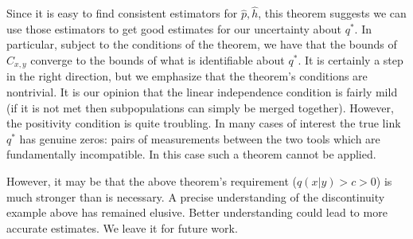 Since it is easy to find consistent estimators for $\hat p,\hat h$, this theorem suggests we can use those estimators to get good estimates for our uncertainty about $q^*$.  In particular, subject to the conditions of the theorem, we have that the bounds of $C_{x,y}$ converge to the bounds of what is identifiable about $q^*$.  It is certainly a step in the right direction, but we emphasize that the theorem's conditions are nontrivial.  It is our opinion that the linear independence condition is fairly mild (if it is not met then subpopulations can simply be merged together).  However, the positivity condition is quite troubling.  In many cases of interest the true link $q^*$ has genuine zeros: pairs of measurements between the two tools which are fundamentally incompatible.  In this case such a theorem cannot be applied.  

However, it may be that the above theorem's requirement ($q(x|y)>c>0$) is much stronger than is necessary.  A precise understanding of the discontinuity example above has remained elusive.  Better understanding could lead to more accurate estimates.  We leave it for future work.









































